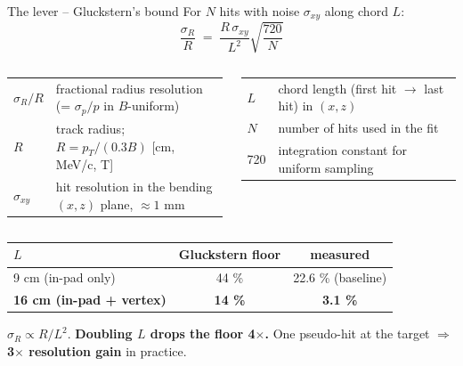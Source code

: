\documentclass[aspectratio=169]{beamer}
\begin{document}
\begin{frame}{The lever -- Gluckstern's bound}
For $N$ hits with noise $\sigma_{xy}$ along chord $L$:
\[
  \boxed{\;\frac{\sigma_R}{R} \;=\; \frac{R\,\sigma_{xy}}{L^2}\sqrt{\frac{720}{N}}\;}
\]
\vspace{-0.5em}

\scriptsize
\begin{columns}[t,onlytextwidth]
\begin{tabular}{@{}ll@{}}
$\sigma_R/R$ & fractional radius resolution (= $\sigma_p/p$ in $B$-uniform) \\
$R$          & track radius; $R = p_T / (0.3 B)$ [cm, MeV/c, T] \\
$\sigma_{xy}$ & hit resolution in the bending $(x,z)$ plane, $\approx 1$ mm \\
\end{tabular}
\begin{tabular}{@{}ll@{}}
$L$ & chord length (first hit $\to$ last hit) in $(x,z)$ \\
$N$ & number of hits used in the fit \\
720 & integration constant for uniform sampling \\
\end{tabular}
\end{columns}
\vspace{0.3em}

\begin{center}
\large
\begin{tabular}{lcc}
\toprule
$L$                              & Gluckstern floor & measured \\
\midrule
9 cm (in-pad only)               & 44 \%          & 22.6 \% (baseline) \\
\textbf{16 cm (in-pad + vertex)} & \textbf{14 \%} & \textbf{3.1 \%} \\
\bottomrule
\end{tabular}
\end{center}
\vspace{0.3em}

$\sigma_R \propto R / L^2$. \textbf{Doubling $L$ drops the floor 4$\times$.}
One pseudo-hit at the target $\Rightarrow$ \textbf{3$\times$ resolution gain} in practice.
\end{frame}
\end{document}
